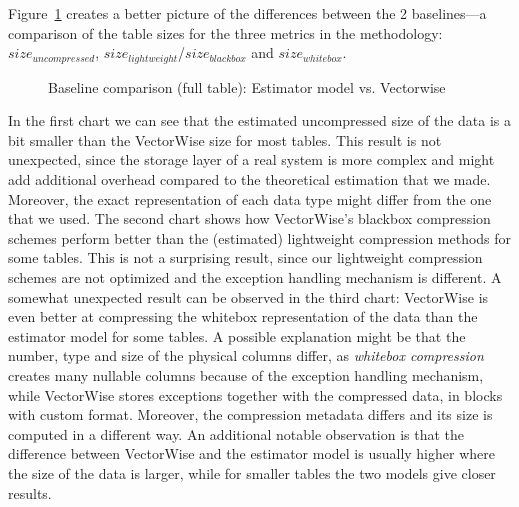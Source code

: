 Figure~\ref{fig:eval:results:estimatorvsvw} creates a better picture of the differences between the 2 baselines---a comparison of the table sizes for the three metrics in the methodology: \(size_{uncompressed}\), \(size_{lightweight}\)/\(size_{blackbox}\) and \(size_{whitebox}\).

\begin{figure}[h]
  \centering
  \caption{Baseline comparison (full table): Estimator model vs. Vectorwise}
  \label{fig:eval:results:estimatorvsvw}
\end{figure}

In the first chart we can see that the estimated uncompressed size of the data is a bit smaller than the VectorWise size for most tables. This result is not unexpected, since the storage layer of a real system is more complex and might add additional overhead compared to the theoretical estimation that we made. Moreover, the exact representation of each data type might differ from the one that we used. The second chart shows how VectorWise's blackbox compression schemes perform better than the (estimated) lightweight compression methods for some tables. This is not a surprising result, since our lightweight compression schemes are not optimized and the exception handling mechanism is different. A somewhat unexpected result can be observed in the third chart: VectorWise is even better at compressing the whitebox representation of the data than the estimator model for some tables. A possible explanation might be that the number, type and size of the physical columns differ, as \textit{whitebox compression} creates many nullable columns because of the exception handling mechanism, while VectorWise stores exceptions together with the compressed data, in blocks with custom format. Moreover, the compression metadata differs and its size is computed in a different way. An additional notable observation is that the difference between VectorWise and the estimator model is usually higher where the size of the data is larger, while for smaller tables the two models give closer results.

